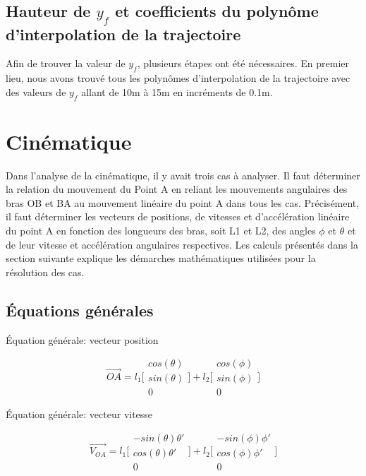 \documentclass{article}
\begin{document}
\subsection{Hauteur de $y_f$ et coefficients du polynôme d'interpolation de la trajectoire}
Afin de trouver la valeur de $y_f$, plusieurs étapes ont été nécessaires. En premier lieu, nous avons trouvé tous les polynômes d'interpolation de la trajectoire avec des valeurs de $y_f$ allant de 10m à 15m en incréments de 0.1m. 

\section{Cinématique}
Dans l'analyse de la cinématique, il y avait trois cas à analyser. Il faut déterminer la relation du mouvement du Point A en reliant les mouvements angulaires des bras OB et BA au mouvement linéaire du point A dans tous les cas. Précisément, il faut déterminer les vecteurs de positions, de vitesses et d'accélération linéaire du point A en fonction des longueurs des bras, soit L1 et L2, des angles $\phi$ et $\theta$ et de leur vitesse et accélération angulaires respectives. Les calculs présentés dans la section suivante explique les démarches mathématiques utilisées pour la résolution des cas.

\subsection{Équations générales}
\noindent Équation générale: vecteur position

\begin{equation}
\overrightarrow{OA} = 
    l_1\Bigg[\begin{array}{cc}
    cos(\theta) \\
    sin(\theta) \\
    0
    \end{array}\Bigg]
    +
    l_2\Bigg[\begin{array}{cc}
    cos(\phi) \\
    sin(\phi) \\
    0
    \end{array}\Bigg]
\end{equation}

\noindent Équation générale: vecteur vitesse

\begin{equation}
\overrightarrow{V_{OA}} = 
    l_1\Bigg[\begin{array}{cc}
    -sin(\theta)\theta' \\
    cos(\theta)\theta' \\
    0
    \end{array}\Bigg]
    +
    l_2\Bigg[\begin{array}{cc}
    -sin(\phi)\phi' \\
    cos(\phi)\phi' \\
    0
    \end{array}\Bigg]
\end{equation}
\end{document}
